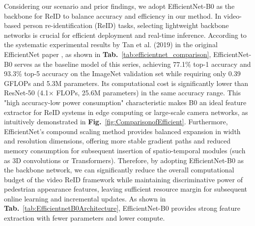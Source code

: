 Considering our scenario and prior findings, we adopt EfficientNet-B0 as the backbone for ReID to balance accuracy and efficiency in our method.
In video-based person re-identification (ReID) tasks, selecting lightweight backbone networks is crucial for efficient deployment and real-time inference. According to the systematic experimental results by Tan et al. (2019) in the original EfficientNet paper \cite{219}, as shown in \textbf{Tab.}~\ref{tab:efficientnet_comparison}, EfficientNet-B0 serves as the baseline model of this series, achieving 77.1\% top-1 accuracy and 93.3\% top-5 accuracy on the ImageNet validation set while requiring only 0.39 GFLOPs and 5.3M parameters. Its computational cost is significantly lower than ResNet-50 (4.1× FLOPs, 25.6M parameters) in the same accuracy range. This "high accuracy-low power consumption" characteristic makes B0 an ideal feature extractor for ReID systems in edge computing or large-scale camera networks, as intuitively demonstrated in \textbf{Fig.}~\ref{fig:ComparisonofEfficient}. Furthermore, EfficientNet's compound scaling method provides balanced expansion in width and resolution dimensions, offering more stable gradient paths and reduced memory consumption for subsequent insertion of spatio-temporal modules (such as 3D convolutions or Transformers). Therefore, by adopting EfficientNet-B0 as the backbone network, we can significantly reduce the overall computational budget of the video ReID framework while maintaining discriminative power of pedestrian appearance features, leaving sufficient resource margin for subsequent online learning and incremental updates. As shown in \textbf{Tab.}~\ref{tab:EfficientnetB0Architecture}, EfficientNet-B0 provides strong feature extraction with fewer parameters and lower compute. \\

